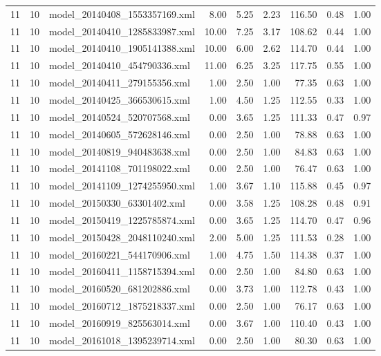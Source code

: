 \begin{table}[ht]
\begin{tabular}{rrlrrrrrr}
   11 &  10 & model\_20140408\_1553357169.xml & 8.00 & 5.25 & 2.23 & 116.50 & 0.48 & 1.00 \\ 
   11 &  10 & model\_20140410\_1285833987.xml & 10.00 & 7.25 & 3.17 & 108.62 & 0.44 & 1.00 \\ 
   11 &  10 & model\_20140410\_1905141388.xml & 10.00 & 6.00 & 2.62 & 114.70 & 0.44 & 1.00 \\ 
   11 &  10 & model\_20140410\_454790336.xml & 11.00 & 6.25 & 3.25 & 117.75 & 0.55 & 1.00 \\ 
   11 &  10 & model\_20140411\_279155356.xml & 1.00 & 2.50 & 1.00 & 77.35 & 0.63 & 1.00 \\ 
   11 &  10 & model\_20140425\_366530615.xml & 1.00 & 4.50 & 1.25 & 112.55 & 0.33 & 1.00 \\ 
   11 &  10 & model\_20140524\_520707568.xml & 0.00 & 3.65 & 1.25 & 111.33 & 0.47 & 0.97 \\ 
   11 &  10 & model\_20140605\_572628146.xml & 0.00 & 2.50 & 1.00 & 78.88 & 0.63 & 1.00 \\ 
   11 &  10 & model\_20140819\_940483638.xml & 0.00 & 2.50 & 1.00 & 84.83 & 0.63 & 1.00 \\ 
   11 &  10 & model\_20141108\_701198022.xml & 0.00 & 2.50 & 1.00 & 76.47 & 0.63 & 1.00 \\ 
   11 &  10 & model\_20141109\_1274255950.xml & 1.00 & 3.67 & 1.10 & 115.88 & 0.45 & 0.97 \\ 
   11 &  10 & model\_20150330\_63301402.xml & 0.00 & 3.58 & 1.25 & 108.28 & 0.48 & 0.91 \\ 
   11 &  10 & model\_20150419\_1225785874.xml & 0.00 & 3.65 & 1.25 & 114.70 & 0.47 & 0.96 \\ 
   11 &  10 & model\_20150428\_2048110240.xml & 2.00 & 5.00 & 1.25 & 111.53 & 0.28 & 1.00 \\ 
   11 &  10 & model\_20160221\_544170906.xml & 1.00 & 4.75 & 1.50 & 114.38 & 0.37 & 1.00 \\ 
   11 &  10 & model\_20160411\_1158715394.xml & 0.00 & 2.50 & 1.00 & 84.80 & 0.63 & 1.00 \\ 
   11 &  10 & model\_20160520\_681202886.xml & 0.00 & 3.73 & 1.00 & 112.78 & 0.43 & 1.00 \\ 
   11 &  10 & model\_20160712\_1875218337.xml & 0.00 & 2.50 & 1.00 & 76.17 & 0.63 & 1.00 \\ 
   11 &  10 & model\_20160919\_825563014.xml & 0.00 & 3.67 & 1.00 & 110.40 & 0.43 & 1.00 \\ 
   11 &  10 & model\_20161018\_1395239714.xml & 0.00 & 2.50 & 1.00 & 80.30 & 0.63 & 1.00 \\ 

\end{tabular}
\end{table}
